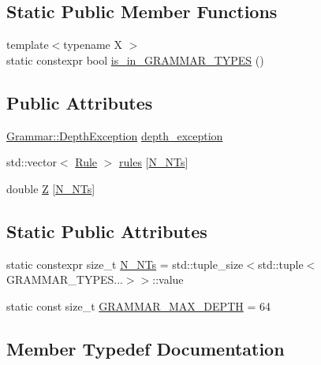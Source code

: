 \subsection*{Static Public Member Functions}
\begin{DoxyCompactItemize}
\item 
{\footnotesize template$<$typename X $>$ }\\static constexpr bool \hyperlink{class_grammar_a9ec7418e0263e2ade2340e248c04275d}{is\+\_\+in\+\_\+\+G\+R\+A\+M\+M\+A\+R\+\_\+\+T\+Y\+P\+ES} ()
\end{DoxyCompactItemize}
\subsection*{Public Attributes}
\begin{DoxyCompactItemize}
\item 
\hyperlink{class_grammar_1_1_depth_exception}{Grammar\+::\+Depth\+Exception} \hyperlink{class_grammar_a3a9a86328940c89b66088b2807c88b68}{depth\+\_\+exception}
\item 
std\+::vector$<$ \hyperlink{class_rule}{Rule} $>$ \hyperlink{class_grammar_a8a89ced0753d72f52ccf2b04c0ccc82b}{rules} \mbox{[}\hyperlink{class_grammar_a45877d4d7a5ee98bf6753af593d6ca08}{N\+\_\+\+N\+Ts}\mbox{]}
\item 
double \hyperlink{class_grammar_a63420ee4232c46523a46bd881cb3e2f5}{Z} \mbox{[}\hyperlink{class_grammar_a45877d4d7a5ee98bf6753af593d6ca08}{N\+\_\+\+N\+Ts}\mbox{]}
\end{DoxyCompactItemize}
\subsection*{Static Public Attributes}
\begin{DoxyCompactItemize}
\item 
static constexpr size\+\_\+t \hyperlink{class_grammar_a45877d4d7a5ee98bf6753af593d6ca08}{N\+\_\+\+N\+Ts} = std\+::tuple\+\_\+size$<$std\+::tuple$<$G\+R\+A\+M\+M\+A\+R\+\_\+\+T\+Y\+P\+E\+S...$>$$>$\+::value
\item 
static const size\+\_\+t \hyperlink{class_grammar_a4a0d1d38426ce7f1b68c001e9ddec064}{G\+R\+A\+M\+M\+A\+R\+\_\+\+M\+A\+X\+\_\+\+D\+E\+P\+TH} = 64
\end{DoxyCompactItemize}


\subsection{Member Typedef Documentation}
\mbox{\label{class_grammar_a5ba44586d1c6f847cbbeeead91964e3c}} 

